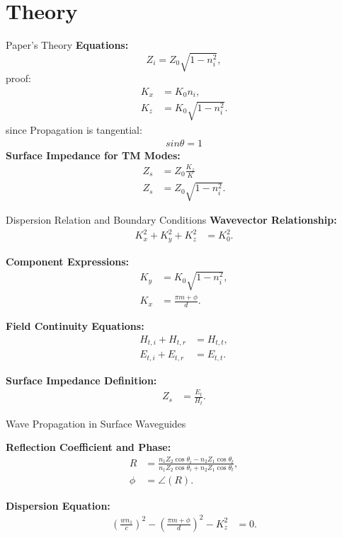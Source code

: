 \documentclass{beamer}
\begin{document}
\section{Theory}
\begin{frame}{Paper's Theory}
    \textbf{Equations:}
    \begin{equation}
        Z_i = Z_0 \sqrt{1 - n_i^2},
    \end{equation}
    proof:
    \begin{align}
        K_x &= K_0 n_i, \\
        K_z &= K_0 \sqrt{1 - n_i^2}.
    \end{align}
    since Propagation is tangential:\\
    \begin{align}
         sin\theta = 1
    \end{align}
    \textbf{Surface Impedance for TM Modes:}
    \begin{align}
        Z_s &= Z_0 \frac{K_z}{K}\\
        Z_s &= Z_0 \sqrt{1 - n_i^2}.
    \end{align}
    
\end{frame}

\begin{frame}{Dispersion Relation and Boundary Conditions}
\textbf{Wavevector Relationship:}
\begin{align}
    K_x^2 + K_y^2 + K_z^2 &= K_0^2.
\end{align}

\textbf{Component Expressions:}
\begin{align}
    K_y &= K_0 \sqrt{1 - n_i^2}, \\
    K_x &= \frac{\pi m + \phi}{d}.
\end{align}

\textbf{Field Continuity Equations:}
\begin{align}
    H_{t,i} + H_{t,r} &= H_{t,t}, \\
    E_{t,i} + E_{t,r} &= E_{t,t}.
\end{align}

\textbf{Surface Impedance Definition:}
\begin{align}
    Z_s &= \frac{E_t}{H_t}.
\end{align}
\end{frame}
\begin{frame}{Wave Propagation in Surface Waveguides}
    
\textbf{Reflection Coefficient and Phase:}
\begin{align}
    R &= \frac{n_1 Z_2 \cos\theta_i - n_2 Z_1 \cos\theta_t}{n_1 Z_2 \cos\theta_i + n_2 Z_1 \cos\theta_t}, \\
    \phi &= \angle(R).
\end{align}

\textbf{Dispersion Equation:}
\begin{align}
    \left( \frac{w n_1}{c} \right)^2 - \left( \frac{\pi m + \phi}{d} \right)^2 - K_z^2 &= 0.
\end{align}
\end{frame}
\end{document}
